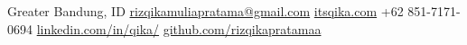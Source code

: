 {Greater Bandung, ID \cvsep \href{mailto:rizqikamuliapratama@gmail.com}{rizqikamuliapratama@gmail.com} \cvsep \href{https://itsqika.com}{itsqika.com}}
{+62 851-7171-0694 \cvsep \href{https://linkedin.com/in/qika/}{linkedin.com/in/qika/} \cvsep \href{https://github.com/rizqikapratamaa}{github.com/rizqikapratamaa}}
